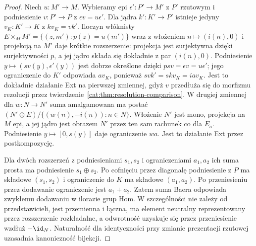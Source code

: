 \begin{proof}
Niech $u:M'\to M$. Wybieramy epi $\epsilon':P'\to M'$ z $P'$ rzutowym i podniesienie $v:P'\to P$ z $\epsilon v=u\epsilon'$. Dla jądra $k':K'\to P'$ istnieje jedyny $v_K:K'\to K$ z $kv_K=vk'$. Iloczyn włóknisty $E\times_M M'=\{(z,m'):p(z)=u(m')\}$ wraz z włożeniem $n\mapsto(i(n),0)$ i projekcją na $M'$ daje krótkie rozszerzenie: projekcja jest surjektywna dzięki surjektywności $p$, a jej jądro składa się dokładnie z par $(i(n),0)$. Podniesienie $y\mapsto(sv(y),\epsilon'(y))$ jest dobrze określone dzięki $psv=\epsilon v=u\epsilon'$; jego ograniczenie do $K'$ odpowiada $av_K$, ponieważ $svk'=skv_K=iav_K$. Jest to dokładnie działanie Ext na pierwszej zmiennej, gdyż $v$ przedłuża się do morfizmu rezolucji przez twierdzenie~\ref{cat:thm:resolution-comparison}. W drugiej zmiennej dla $w:N\to N'$ suma amalgamowana ma postać $(N'\oplus E)/\{(w(n),-i(n)):n\in N\}$. Włożenie $N'$ jest mono, projekcja na $M$ epi, a jej jądro jest obrazem $N'$ przez ten sam rachunek co dla $E_a$. Podniesienie $y\mapsto[0,s(y)]$ daje ograniczenie $wa$. Jest to działanie Ext przez postkompozycję.

Dla dwóch rozszerzeń z podniesieniami $s_1,s_2$ i ograniczeniami $a_1,a_2$ ich suma prosta ma podniesienie $s_1\oplus s_2$. Po cofnięciu przez diagonalę podniesienie z $P$ ma składowe $(s_1,s_2)$ i ograniczenie do $K$ ma składowe $(a_1,a_2)$. Po przeniesieniu przez dodawanie ograniczenie jest $a_1+a_2$. Zatem suma Baera odpowiada zwykłemu dodawaniu w ilorazie grup Hom. W szczególności nie zależy od przedstawicieli, jest przemienna i łączna, ma element neutralny reprezentowany przez rozszerzenie rozkładalne, a odwrotność uzyskuje się przez przeniesienie wzdłuż $-\id_N$. Naturalność dla identyczności przy zmianie prezentacji rzutowej uzasadnia kanoniczność bijekcji.
\end{proof}

